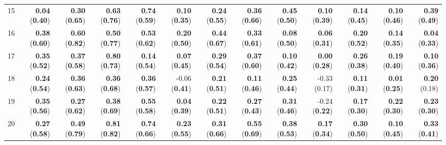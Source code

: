 \begin{sidewaystable}[ht]
\begin{center}
\begin{tabular}{rrrrr|rrrr|rrrr}
    15 & {\bf 0.04} ({\bf 0.40}) & {\bf 0.30} ({\bf 0.65}) & {\bf 0.63} ({\bf 0.76}) & {\bf 0.74} ({\bf 0.59}) & {\bf 0.10} ({\bf 0.35}) & {\bf 0.24} ({\bf 0.55}) & {\bf 0.36} ({\bf 0.66}) & {\bf 0.45} ({\bf 0.50}) & {\bf 0.10} ({\bf 0.39}) & {\bf 0.14} ({\bf 0.45}) & {\bf 0.10} ({\bf 0.46}) & {\bf 0.39} ({\bf 0.49}) \\ 
    16 & {\bf 0.38} ({\bf 0.60}) & {\bf 0.60} ({\bf 0.82}) & {\bf 0.50} ({\bf 0.77}) & {\bf 0.53} ({\bf 0.62}) & {\bf 0.20} ({\bf 0.50}) & {\bf 0.44} ({\bf 0.67}) & {\bf 0.33} ({\bf 0.61}) & {\bf 0.08} ({\bf 0.50}) & {\bf 0.06} ({\bf 0.31}) & {\bf 0.20} ({\bf 0.52}) & {\bf 0.14} ({\bf 0.35}) & {\bf 0.04} ({\bf 0.33}) \\ 
    17 & {\bf 0.35} ({\bf 0.52}) & {\bf 0.37} ({\bf 0.58}) & {\bf 0.80} ({\bf 0.73}) & {\bf 0.14} ({\bf 0.54}) & {\bf 0.07} ({\bf 0.45}) & {\bf 0.29} ({\bf 0.54}) & {\bf 0.37} ({\bf 0.60}) & {\bf 0.10} ({\bf 0.42}) & {\bf 0.00} ({\bf 0.28}) & {\bf 0.26} ({\bf 0.38}) & {\bf 0.19} ({\bf 0.40}) & {\bf 0.10} ({\bf 0.36}) \\ 
    18 & {\bf 0.24} ({\bf 0.54}) & {\bf 0.36} ({\bf 0.63}) & {\bf 0.36} ({\bf 0.68}) & {\bf 0.36} ({\bf 0.57}) & -0.06 ({\bf 0.41}) & {\bf 0.21} ({\bf 0.51}) & {\bf 0.11} ({\bf 0.46}) & {\bf 0.25} ({\bf 0.44}) & -0.33 (0.17) & {\bf 0.11} ({\bf 0.31}) & {\bf 0.01} ({\bf 0.25}) & {\bf 0.20} (0.18) \\ 
    19 & {\bf 0.35} ({\bf 0.56}) & {\bf 0.27} ({\bf 0.62}) & {\bf 0.38} ({\bf 0.69}) & {\bf 0.55} ({\bf 0.58}) & {\bf 0.04} ({\bf 0.39}) & {\bf 0.22} ({\bf 0.51}) & {\bf 0.27} ({\bf 0.43}) & {\bf 0.31} ({\bf 0.46}) & -0.24 ({\bf 0.22}) & {\bf 0.17} ({\bf 0.30}) & {\bf 0.22} ({\bf 0.30}) & {\bf 0.23} ({\bf 0.30}) \\ 
    20 & {\bf 0.27} ({\bf 0.58}) & {\bf 0.49} ({\bf 0.79}) & {\bf 0.81} ({\bf 0.82}) & {\bf 0.74} ({\bf 0.66}) & {\bf 0.23} ({\bf 0.55}) & {\bf 0.31} ({\bf 0.66}) & {\bf 0.55} ({\bf 0.69}) & {\bf 0.38} ({\bf 0.53}) & {\bf 0.17} ({\bf 0.34}) & {\bf 0.30} ({\bf 0.50}) & {\bf 0.10} ({\bf 0.45}) & {\bf 0.33} ({\bf 0.41}) \\
   \bottomrule
\end{tabular}
\end{center}
\end{sidewaystable}

